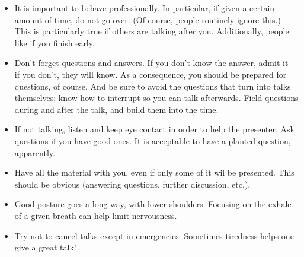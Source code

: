 \begin{itemize}
\item It is important to behave professionally. In particular, if given a certain amount of time, do not go over. (Of course, people routinely ignore this.) This is particularly true if others are talking after you. Additionally, people like if you finish early.
\item Don't forget questions and answers. If you don't know the answer, admit it --- if you don't, they will know. As a consequence, you should be prepared for questions, of course. And be sure to avoid the questions that turn into talks themselves; know how to interrupt so you can talk afterwards. Field questions during and after the talk, and build them into the time.
\item If not talking, listen and keep eye contact in order to help the presenter. Ask questions if you have good ones. It is acceptable to have a planted question, apparently.
\item Have all the material with you, even if only some of it wil be presented. This should be obvious (answering questions, further discussion, etc.).
\item Good posture goes a long way, with lower shoulders. Focusing on the exhale of a given breath can help limit nervousness.
\item Try not to cancel talks except in emergencies. Sometimes tiredness helps one give a great talk!
\end{itemize}
